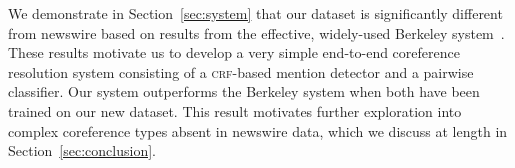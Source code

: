We demonstrate in Section~\ref{sec:system} that our dataset is
significantly different from newswire based on results from the
effective, widely-used Berkeley system~\cite{DurrettKlein2013}. These
results motivate us to develop a very simple end-to-end coreference
resolution system consisting of a \textsc{crf}-based mention detector
and a pairwise classifier. Our system outperforms the Berkeley system
when both have been trained on our new dataset. This result motivates
further exploration into complex coreference types absent in newswire
data, which we discuss at length in
Section~\ref{sec:conclusion}.
